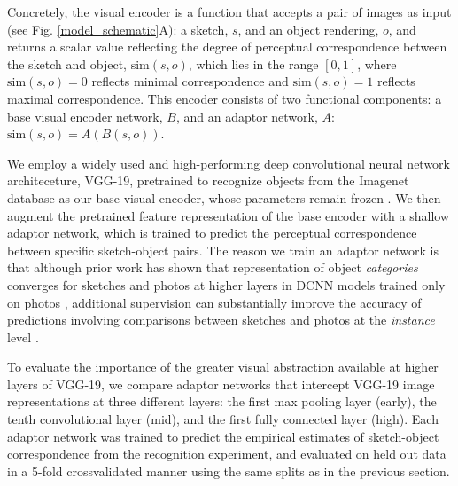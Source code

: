 \documentclass[9pt,twocolumn,twoside]{pnas-new}
\begin{document}

Concretely, the visual encoder is a function that accepts a pair of images as input (see Fig. \ref{model_schematic}A): a sketch, $s$, and an object rendering, $o$, and returns a scalar value reflecting the degree of perceptual correspondence between the sketch and object, $\textrm{sim}(s,o)$, which lies in the range $[0,1]$, where $\textrm{sim}(s,o)=0$ reflects minimal correspondence and $\textrm{sim}(s,o)=1$ reflects maximal correspondence.
This encoder consists of two functional components: a base visual encoder network, $B$, and an adaptor network, $A$: $\textrm{sim}(s,o) = A(B(s,o))$.

We employ a widely used and high-performing deep convolutional neural network architeceture, VGG-19, pretrained to recognize objects from the Imagenet database as our base visual encoder, whose parameters remain frozen \cite{simonyan2014very}. 
We then augment the pretrained feature representation of the base encoder with a shallow adaptor network, which is trained to predict the perceptual correspondence between specific sketch-object pairs.
The reason we train an adaptor network is that although prior work has shown that representation of object \textit{categories} converges for sketches and photos at higher layers in DCNN models trained only on photos \cite{FanCommon2018}, additional supervision can substantially improve the accuracy of predictions involving comparisons between sketches and photos at the \textit{instance} level \cite{sangkloy2016sketchy}. 


To evaluate the importance of the greater visual abstraction available at higher layers of VGG-19, we compare adaptor networks that intercept VGG-19 image representations at three different layers: the first max pooling layer (early), the tenth convolutional layer (mid), and the first fully connected layer (high).
Each adaptor network was trained to predict the empirical estimates of sketch-object correspondence from the recognition experiment, and evaluated on held out data in a 5-fold crossvalidated manner using the same splits as in the previous section. 
\end{document}
